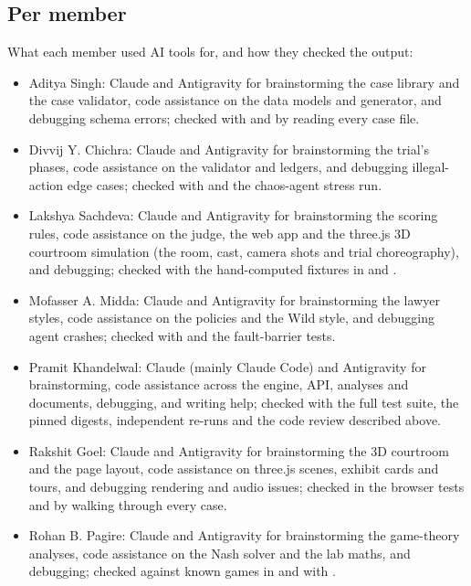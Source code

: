 \subsection{Per member}
What each member used AI tools for, and how they checked the output:
\begin{itemize}
\item Aditya Singh: Claude and Antigravity for brainstorming the case library and the case validator, code assistance on the data models and generator, and debugging schema errors; checked with  and by reading every case file.
\item Divvij Y. Chichra: Claude and Antigravity for brainstorming the trial's phases, code assistance on the validator and ledgers, and debugging illegal-action edge cases; checked with  and the chaos-agent stress run.
\item Lakshya Sachdeva: Claude and Antigravity for brainstorming the scoring rules, code assistance on the judge, the web app and the three.js 3D courtroom simulation (the room, cast, camera shots and trial choreography), and debugging; checked with the hand-computed fixtures in  and .
\item Mofasser A. Midda: Claude and Antigravity for brainstorming the lawyer styles, code assistance on the policies and the Wild style, and debugging agent crashes; checked with  and the fault-barrier tests.
\item Pramit Khandelwal: Claude (mainly Claude Code) and Antigravity for brainstorming, code assistance across the engine, API, analyses and documents, debugging, and writing help; checked with the full test suite, the pinned digests, independent re-runs and the code review described above.
\item Rakshit Goel: Claude and Antigravity for brainstorming the 3D courtroom and the page layout, code assistance on three.js scenes, exhibit cards and tours, and debugging rendering and audio issues; checked in the browser tests and by walking through every case.
\item Rohan B. Pagire: Claude and Antigravity for brainstorming the game-theory analyses, code assistance on the Nash solver and the lab maths, and debugging; checked against known games in  and with .
\end{itemize}
